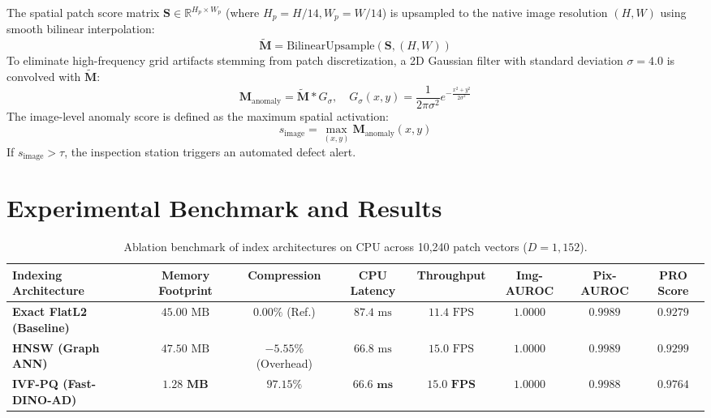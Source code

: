 \documentclass[10pt,journal,compsoc]{IEEEtran}
\begin{document}
The spatial patch score matrix $\mathbf{S} \in \mathbb{R}^{H_p \times W_p}$ (where $H_p = H/14, W_p = W/14$) is upsampled to the native image resolution $(H, W)$ using smooth bilinear interpolation:
\begin{equation}
\mathbf{\tilde{M}} = \text{BilinearUpsample}(\mathbf{S}, (H, W))
\end{equation}
To eliminate high-frequency grid artifacts stemming from patch discretization, a 2D Gaussian filter with standard deviation $\sigma = 4.0$ is convolved with $\mathbf{\tilde{M}}$:
\begin{equation}
\mathbf{M}_{\text{anomaly}} = \mathbf{\tilde{M}} * G_\sigma, \quad G_\sigma(x, y) = \frac{1}{2\pi \sigma^2} e^{-\frac{x^2+y^2}{2\sigma^2}}
\end{equation}
The image-level anomaly score is defined as the maximum spatial activation:
\begin{equation}
s_{\text{image}} = \max_{(x,y)} \mathbf{M}_{\text{anomaly}}(x,y)
\end{equation}
If $s_{\text{image}} > \tau$, the inspection station triggers an automated defect alert.

\section{Experimental Benchmark and Results}

\begin{table}[!t]
\caption{Ablation benchmark of index architectures on CPU across 10,240 patch vectors ($D=1{,}152$).}
\label{tab:results}
\centering
\begin{tabular}{lccccccc}
\toprule
\textbf{Indexing Architecture} & \textbf{Memory Footprint} & \textbf{Compression} & \textbf{CPU Latency} & \textbf{Throughput} & \textbf{Img-AUROC} & \textbf{Pix-AUROC} & \textbf{PRO Score} \\
\midrule
\textbf{Exact FlatL2 (Baseline)} & $45.00\text{ MB}$ & $0.00\%$ (Ref.) & $87.4\text{ ms}$ & $11.4\text{ FPS}$ & $\mathbf{1.0000}$ & $\mathbf{0.9989}$ & $0.9279$ \\
\textbf{HNSW (Graph ANN)}        & $47.50\text{ MB}$ & $-5.55\%$ (Overhead) & $66.8\text{ ms}$ & $15.0\text{ FPS}$ & $\mathbf{1.0000}$ & $\mathbf{0.9989}$ & $0.9299$ \\
\textbf{IVF-PQ (Fast-DINO-AD)}    & $\mathbf{1.28\text{ MB}}$ & $\mathbf{97.15\%}$ & $\mathbf{66.6\text{ ms}}$ & $\mathbf{15.0\text{ FPS}}$ & $\mathbf{1.0000}$ & $\mathbf{0.9988}$ & $\mathbf{0.9764}$ \\
\bottomrule
\end{tabular}
\end{table}
\end{document}
